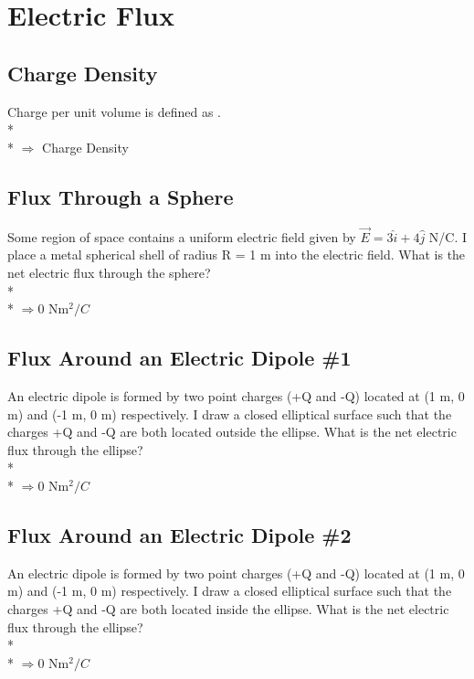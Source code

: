\documentclass[11pt]{article}
\begin{document}

\pagebreak
\section{Electric Flux}

\subsection{Charge Density}
Charge per unit volume is defined as \underline{\hspace{1cm}}. \\* \\*
$\Rightarrow$ Charge Density

\subsection{Flux Through a Sphere}
Some region of space contains a uniform electric field given by $\vec{E} = 3\hat{i} + 4\hat{j}$ N/C.  I place a metal spherical shell of radius R = 1 m into the electric field.  What is the net electric flux through the sphere? \\* \\*
$\Rightarrow 0$ Nm$^2/C$

\subsection{Flux Around an Electric Dipole \#1}
An electric dipole is formed by two point charges (+Q and -Q) located at (1 m, 0 m) and (-1 m, 0 m) respectively.  I draw a closed elliptical surface such that the charges +Q and -Q are both located outside the ellipse.  What is the net electric flux through the ellipse? \\* \\*
$\Rightarrow 0$ Nm$^2/C$

\subsection{Flux Around an Electric Dipole \#2}
An electric dipole is formed by two point charges (+Q and -Q) located at (1 m, 0 m) and (-1 m, 0 m) respectively.  I draw a closed elliptical surface such that the charges +Q and -Q are both located inside the ellipse.  What is the net electric flux through the ellipse? \\* \\*
$\Rightarrow 0$ Nm$^2/C$

\end{document}
